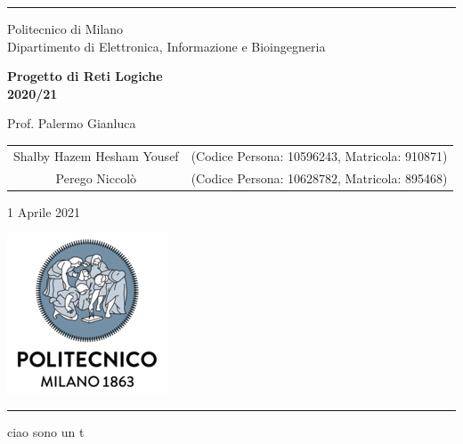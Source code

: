 \documentclass[14pt]{article}
\begin{document}
\begin{titlepage}
    \centering
    \hrule

    \vspace{0,5cm}
    {
        \normalsize Politecnico di Milano\\
	                Dipartimento di Elettronica, Informazione e Bioingegneria \par
    }
    
    \vspace{4,5cm}
    {\Huge \textbf{Progetto di Reti Logiche\\
    2020/21}\\}

    \vspace{0,5cm}
    \large {Prof. Palermo Gianluca}
        
    \vspace{2,5cm}
    {
        \large
        \begin{tabular}{c c}
            Shalby Hazem Hesham Yousef & (Codice Persona: 10596243, Matricola: 910871)\\
            Perego Niccolò & (Codice Persona: 10628782, Matricola: 895468)\\
        \end{tabular}
    
    }
    
    \vspace{5,2cm}

        \normalsize{1 Aprile 2021 \par}
        \vspace{0,3cm}

        \centering\hspace{0,2cm}\includegraphics[scale=0.6]{logo.png}
        \vspace{0,5cm}
        \hrule
        \pagebreak

\end{titlepage}

ciao sono un t
\end{document}
